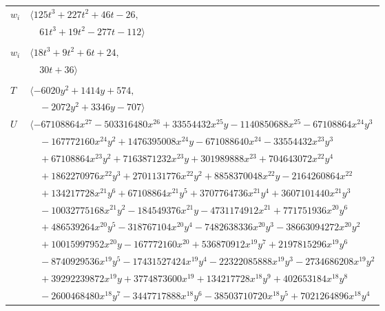 \documentclass[11pt]{article}
\begin{document}
\begin{longtable}{@{}ll@{}}
$w_i$ & $\langle 125t^{3}+227t^{2}+46t-26,$\\
 & $\quad 61t^{3}+19t^{2}-277t-112\rangle$\\
\addlinespace[2pt]
\multicolumn{2}{@{}p{0.97\textwidth}@{}}{$i=30$, $D_i=4$, $\rho_{ij}$: $4{:}1, \allowbreak 17{:}2, \allowbreak 20{:}2, \allowbreak 38{:}2$}\\
$w_i$ & $\langle 18t^{3}+9t^{2}+6t+24,$\\
 & $\quad 30t+36\rangle$\\
\addlinespace[2pt]
\multicolumn{2}{@{}p{0.97\textwidth}@{}}{$i=31$, $D_i=256$, $\rho_{ij}$: $3{:}2, \allowbreak 5{:}1, \allowbreak 6{:}2, \allowbreak 8{:}1, \allowbreak 17{:}1, \allowbreak 19{:}1, \allowbreak 22{:}2, \allowbreak 23{:}1, \allowbreak 25{:}2, \allowbreak 26{:}1, \allowbreak 28{:}2, \allowbreak 29{:}1, \allowbreak 32{:}1, \allowbreak 34{:}2, \allowbreak 37{:}2, \allowbreak 38{:}1$}\\
$T$ & $\langle -6020y^{2}+1414y+574,$\\
 & $\quad -2072y^{2}+3346y-707\rangle$\\
$U$ & $\langle -67108864x^{27}-503316480x^{26}+33554432x^{25}y-1140850688x^{25}-67108864x^{24}y^{3}$\\
 & $\quad -167772160x^{24}y^{2}+1476395008x^{24}y-671088640x^{24}-33554432x^{23}y^{3}$\\
 & $\quad +67108864x^{23}y^{2}+7163871232x^{23}y+301989888x^{23}+704643072x^{22}y^{4}$\\
 & $\quad +1862270976x^{22}y^{3}+2701131776x^{22}y^{2}+8858370048x^{22}y-2164260864x^{22}$\\
 & $\quad +134217728x^{21}y^{6}+67108864x^{21}y^{5}+3707764736x^{21}y^{4}+3607101440x^{21}y^{3}$\\
 & $\quad -10032775168x^{21}y^{2}-184549376x^{21}y-4731174912x^{21}+771751936x^{20}y^{6}$\\
 & $\quad +486539264x^{20}y^{5}-318767104x^{20}y^{4}-7482638336x^{20}y^{3}-38663094272x^{20}y^{2}$\\
 & $\quad +10015997952x^{20}y-167772160x^{20}+536870912x^{19}y^{7}+2197815296x^{19}y^{6}$\\
 & $\quad -8740929536x^{19}y^{5}-17431527424x^{19}y^{4}-22322085888x^{19}y^{3}-2734686208x^{19}y^{2}$\\
 & $\quad +39292239872x^{19}y+3774873600x^{19}+134217728x^{18}y^{9}+402653184x^{18}y^{8}$\\
 & $\quad -2600468480x^{18}y^{7}-3447717888x^{18}y^{6}-38503710720x^{18}y^{5}+7021264896x^{18}y^{4}$\\

\end{longtable}
\end{document}
